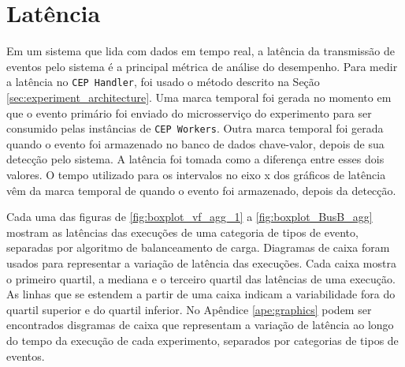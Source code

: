 \newpage


\section{Latência}
\label{sec:latency}







Em um sistema que lida com dados em tempo real, a latência da transmissão de eventos pelo sistema é a principal métrica de análise do desempenho. Para medir a latência no \texttt{CEP Handler}, foi usado o método descrito na Seção  \ref{sec:experiment_architecture}. Uma marca temporal foi gerada no momento em que o evento primário foi enviado do microsserviço do experimento para ser consumido pelas instâncias de \texttt{CEP Workers}. Outra marca temporal foi gerada quando o evento foi armazenado no banco de dados chave-valor, depois de sua detecção pelo sistema. A latência foi tomada como a diferença entre esses dois valores. O tempo utilizado para os intervalos no eixo x dos gráficos de latência vêm da marca temporal de quando o evento foi armazenado, depois da detecção. 

Cada uma das figuras de \ref{fig:boxplot_vf_agg_1} a \ref{fig:boxplot_BusB_agg} mostram as latências das execuções de uma categoria de tipos de evento, separadas por algoritmo de balanceamento de carga. Diagramas de caixa foram usados para representar a variação de latência das execuções. Cada caixa mostra o primeiro quartil, a mediana e o terceiro quartil das latências de uma execução.  As linhas que se estendem a partir de uma caixa indicam a variabilidade fora do quartil superior e do quartil inferior. No Apêndice \ref{ape:graphics} podem ser encontrados disgramas de caixa que representam a variação de latência ao longo do tempo da execução de cada experimento, separados por categorias de tipos de eventos.


